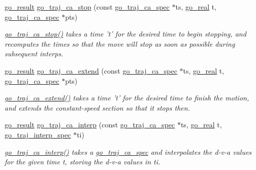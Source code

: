 \begin{DoxyCompactItemize}
\hyperlink{gotypes_8h_a55d48b38cd959f63c7e8db8337a9792a}{go\-\_\-result} \hyperlink{namespacegomotion_aeb9f59e687213362972a8405d6210b11}{go\-\_\-traj\-\_\-ca\-\_\-stop} (const \hyperlink{structgomotion_1_1go__traj__ca__spec}{go\-\_\-traj\-\_\-ca\-\_\-spec} $\ast$ts, \hyperlink{gotypes_8h_afd666a2393eebd71ee455846ac9def9b}{go\-\_\-real} t, \hyperlink{structgomotion_1_1go__traj__ca__spec}{go\-\_\-traj\-\_\-ca\-\_\-spec} $\ast$pts)
\begin{DoxyCompactList}\small\item\em \hyperlink{namespacegomotion_aeb9f59e687213362972a8405d6210b11}{go\-\_\-traj\-\_\-ca\-\_\-stop()} takes a time 't' for the desired time to begin stopping, and recomputes the times so that the move will stop as soon as possible during subsequent interps. \end{DoxyCompactList}\item 
\hyperlink{gotypes_8h_a55d48b38cd959f63c7e8db8337a9792a}{go\-\_\-result} \hyperlink{namespacegomotion_a5f1160c8b5662ad14fb8987be62e379d}{go\-\_\-traj\-\_\-ca\-\_\-extend} (const \hyperlink{structgomotion_1_1go__traj__ca__spec}{go\-\_\-traj\-\_\-ca\-\_\-spec} $\ast$ts, \hyperlink{gotypes_8h_afd666a2393eebd71ee455846ac9def9b}{go\-\_\-real} t, \hyperlink{structgomotion_1_1go__traj__ca__spec}{go\-\_\-traj\-\_\-ca\-\_\-spec} $\ast$pts)
\begin{DoxyCompactList}\small\item\em \hyperlink{namespacegomotion_a5f1160c8b5662ad14fb8987be62e379d}{go\-\_\-traj\-\_\-ca\-\_\-extend()} takes a time 't' for the desired time to finish the motion, and extends the constant-\/speed section so that it stops then. \end{DoxyCompactList}\item 
\hyperlink{gotypes_8h_a55d48b38cd959f63c7e8db8337a9792a}{go\-\_\-result} \hyperlink{namespacegomotion_aa138950bb1c02fcbeeb017e61fd061e0}{go\-\_\-traj\-\_\-ca\-\_\-interp} (const \hyperlink{structgomotion_1_1go__traj__ca__spec}{go\-\_\-traj\-\_\-ca\-\_\-spec} $\ast$ts, \hyperlink{gotypes_8h_afd666a2393eebd71ee455846ac9def9b}{go\-\_\-real} t, \hyperlink{structgomotion_1_1go__traj__interp__spec}{go\-\_\-traj\-\_\-interp\-\_\-spec} $\ast$ti)
\begin{DoxyCompactList}\small\item\em \hyperlink{namespacegomotion_aa138950bb1c02fcbeeb017e61fd061e0}{go\-\_\-traj\-\_\-ca\-\_\-interp()} takes a \hyperlink{structgomotion_1_1go__traj__ca__spec}{go\-\_\-traj\-\_\-ca\-\_\-spec} and interpolates the d-\/v-\/a values for the given time t, storing the d-\/v-\/a values in ti. \end{DoxyCompactList}\item 

\end{DoxyCompactItemize}
